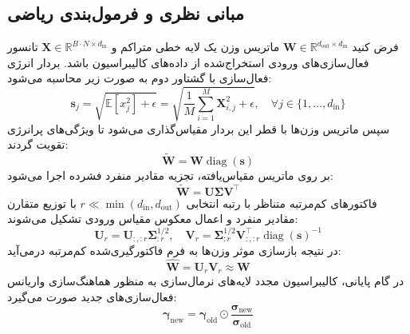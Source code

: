 \subsection{مبانی نظری و فرمول‌بندی ریاضی}
فرض کنید $\mathbf{W} \in \mathbb{R}^{d_{\text{out}} \times d_{\text{in}}}$ ماتریس وزن یک لایه خطی متراکم و $\mathbf{X} \in \mathbb{R}^{B \cdot N \times d_{\text{in}}}$ تانسور فعال‌سازی‌های ورودی استخراج‌شده از داده‌های کالیبراسیون باشد. بردار انرژی فعال‌سازی با گشتاور دوم به صورت زیر محاسبه می‌شود:
\begin{equation}
\mathbf{s}_j = \sqrt{\mathbb{E}[x_j^2] + \epsilon} = \sqrt{\frac{1}{M}\sum_{i=1}^M \mathbf{X}_{i, j}^2 + \epsilon}, \quad \forall j \in \{1, \dots, d_{\text{in}}\}
\end{equation}
سپس ماتریس وزن‌ها با قطر این بردار مقیاس‌گذاری می‌شود تا ویژگی‌های پرانرژی تقویت گردند:
\begin{equation}
\tilde{\mathbf{W}} = \mathbf{W} \operatorname{diag}(\mathbf{s})
\end{equation}
بر روی ماتریس مقیاس‌یافته، تجزیه مقادیر منفرد فشرده اجرا می‌شود:
\begin{equation}
\tilde{\mathbf{W}} = \mathbf{U} \mathbf{\Sigma} \mathbf{V}^\top
\end{equation}
فاکتورهای کم‌مرتبه متناظر با رتبه انتخابی $r \ll \min(d_{\text{in}}, d_{\text{out}})$ با توزیع متقارن مقادیر منفرد و اعمال معکوس مقیاس ورودی تشکیل می‌شوند:
\begin{equation}
\mathbf{U}_r = \mathbf{U}_{:, :r} \mathbf{\Sigma}_{:r}^{1/2}, \quad \mathbf{V}_r = \mathbf{\Sigma}_{:r}^{1/2} \mathbf{V}_{:, :r}^\top \operatorname{diag}(\mathbf{s})^{-1}
\end{equation}
در نتیجه بازسازی موثر وزن‌ها به فرم فاکتورگیری‌شده کم‌مرتبه درمی‌آید:
\begin{equation}
\hat{\mathbf{W}} = \mathbf{U}_r \mathbf{V}_r \approx \mathbf{W}
\end{equation}
در گام پایانی، کالیبراسیون مجدد لایه‌های نرمال‌سازی به منظور هماهنگ‌سازی واریانس فعال‌سازی‌های جدید صورت می‌گیرد:
\begin{equation}
\boldsymbol{\gamma}_{\text{new}} = \boldsymbol{\gamma}_{\text{old}} \odot \frac{\boldsymbol{\sigma}_{\text{new}}}{\boldsymbol{\sigma}_{\text{old}}}
\end{equation}

